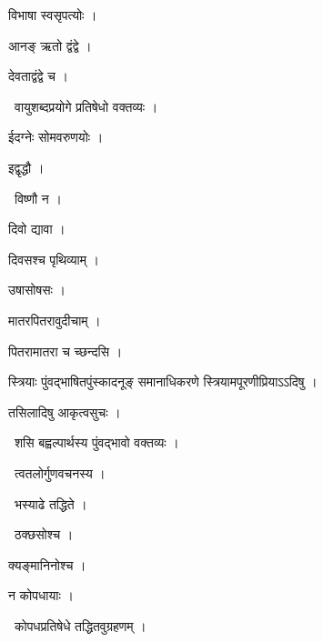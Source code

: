 \documentclass[10pt, openany, oneside]{book}
\begin{document}
\noindent विभाषा स्वसृपत्योः ।

\noindent आनङ् ऋतो द्वंद्वे ।

\noindent देवताद्वंद्वे च ।

\par\noindent\hspace{1.5em}{\vps वा॰}~{\qt वायुशब्दप्रयोगे प्रतिषेधो वक्तव्यः ।}

\noindent ईदग्नेः सोमवरुणयोः ।

\noindent इद्वृद्धौ ।

\par\noindent\hspace{1.5em}{\vps वा॰}~{\qt विष्णौ न ।}

\noindent दिवो द्यावा ।

\noindent दिवसश्च पृथिव्याम् ।

\noindent उषासोषसः ।

\noindent मातरपितरावुदीचाम् ।

\noindent पितरामातरा च च्छन्दसि ।

\noindent स्त्रियाः पुंवद्भाषितपुंस्कादनूङ् समानाधिकरणे स्त्रियामपूरणीप्रियाऽऽदिषु ।

\noindent तसिलादिषु आकृत्वसुचः ।

\par\noindent\hspace{1.5em}{\vps वा॰}~{\qt शसि बह्वल्पार्थस्य पुंवद्भावो वक्तव्यः ।}

\par\noindent\hspace{1.5em}{\vps वा॰}~{\qt त्वतलोर्गुणवचनस्य ।}

\par\noindent\hspace{1.5em}{\vps वा॰}~{\qt भस्याढे तद्धिते ।}

\par\noindent\hspace{1.5em}{\vps वा॰}~{\qt ठक्छसोश्च ।}

\noindent क्यङ्मानिनोश्च ।

\noindent न कोपधायाः ।

\par\noindent\hspace{1.5em}{\vps वा॰}~{\qt कोपधप्रतिषेधे तद्धितवुग्रहणम् ।}
\end{document}
